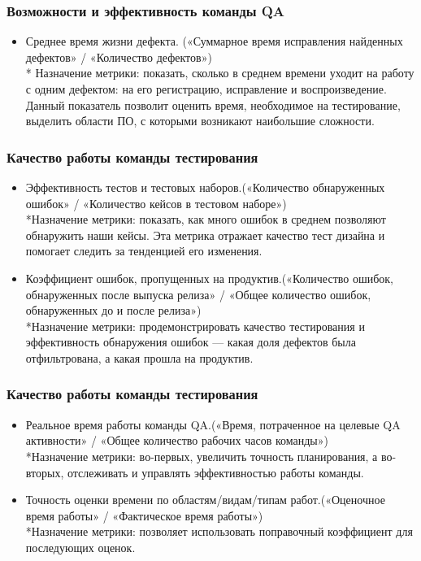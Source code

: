 \documentclass{../industrial-development}
\begin{document}
	\begin{frame} \frametitle{Возможности и эффективность команды QA}
		\begin{itemize}
			\item Среднее время жизни дефекта. («Суммарное время исправления найденных дефектов» / «Количество дефектов»)
			\\* Назначение метрики: показать, сколько в среднем времени уходит на работу с одним дефектом: на его регистрацию, исправление и воспроизведение. Данный показатель позволит оценить время, необходимое на тестирование, выделить области ПО, с которыми возникают наибольшие сложности. 
		\end{itemize}
	\end{frame}

	\begin{frame} \frametitle{Качество работы команды тестирования}
		\begin{itemize}
			\item Эффективность тестов и тестовых наборов.(«Количество обнаруженных ошибок» / «Количество кейсов в тестовом наборе»)
			\\*Назначение метрики: показать, как много ошибок в среднем позволяют обнаружить наши кейсы. Эта метрика отражает качество тест дизайна и помогает следить за тенденцией его изменения. 
			\item Коэффициент ошибок, пропущенных на продуктив.(«Количество ошибок, обнаруженных после выпуска релиза» / «Общее количество ошибок, обнаруженных до и после релиза»)
			\\*Назначение метрики: продемонстрировать качество тестирования и эффективность обнаружения ошибок --- какая доля дефектов была отфильтрована, а какая прошла на продуктив.
		\end{itemize}
	\end{frame}

		\begin{frame} \frametitle{Качество работы команды тестирования}
		\begin{itemize}
			\item Реальное время работы команды QA.(«Время, потраченное на целевые QA активности» / «Общее количество рабочих часов команды»)
			\\*Назначение метрики: во-первых, увеличить точность планирования, а во-вторых, отслеживать и управлять эффективностью работы команды.
			\item Точность оценки времени по областям/видам/типам работ.(«Оценочное время работы» / «Фактическое время работы»)
			\\*Назначение метрики: позволяет использовать поправочный коэффициент для последующих оценок.
		\end{itemize}
	\end{frame}
\end{document}
